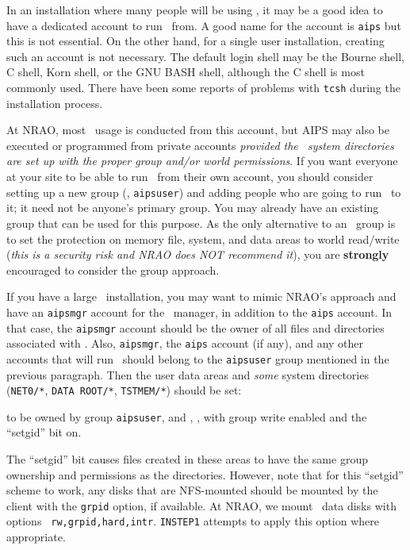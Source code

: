 \vfill\eject
{}


In an installation where many people will be using \AIPS, it may be a good
idea to have a dedicated account to run \AIPS\ from.  A good name for the
account is {\tt aips} but this is not essential.  On the other hand, for a
single user installation, creating such an account is not necessary.  The
default login shell may be the Bourne shell, C shell, Korn shell, or the
GNU BASH shell, although the C shell is most commonly used.  There have
been some reports of problems with {\tt tcsh} during the installation
process.

At NRAO, most \AIPS\ usage is conducted from this account, but AIPS
may also be executed or programmed from private accounts {\it provided
the \AIPS\ system directories are set up with the proper group and/or
world permissions\/}.  If you want everyone at your site to be able to
run \AIPS\ from their own account, you should consider setting up a new
group (\eg, {\tt aipsuser}) and adding people who are going to run
\AIPS\ to it; it need not be anyone's primary group.  You may already have
an existing group that can be used for this purpose.  As the only
alternative to an \AIPS\ group is to set the protection on memory file,
system, and data areas to world read/write ({\it this is a security risk
and NRAO does NOT recommend it\/}), you are {\bf strongly} encouraged to
consider the group approach.

If you have a large \AIPS\ installation, you may want to mimic NRAO's
approach and have an {\tt aipsmgr} account for the \AIPS\ manager, in
addition to the {\tt aips} account.  In that case, the {\tt aipsmgr}
account should be the owner of all files and directories associated with
\AIPS.  Also, {\tt aipsmgr}, the {\tt aips} account (if any), and any other
accounts that will run \AIPS\ should belong to the {\tt aipsuser} group
mentioned in the previous paragraph.  Then the user data areas and {\it
some\/} system directories ({\tt\dol NET0/*}, {\tt \dol DATA
ROOT/*}, {\tt\dol TSTMEM/*}) should be set:\medskip

{\ndot to be owned by group {\tt aipsuser}, and}
{, \ie, with group write enabled and the
        ``setgid'' bit on.\medskip}\medskip

\noindent The ``setgid'' bit causes files created in these areas to have
the same group ownership and permissions as the directories.  However,
note that for this ``setgid'' scheme to work, any disks that are
NFS-mounted should be mounted by the client with the {\tt grpid} option,
if available.  At NRAO, we mount \AIPS\ data disks with options {\tt
rw,grpid,hard,intr}.  {\tt INSTEP1} attempts to apply this option where
appropriate.

